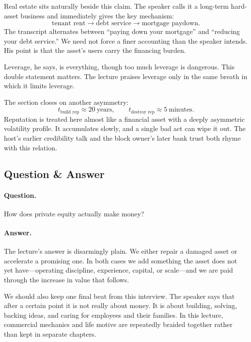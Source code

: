 Real estate sits naturally beside this claim. The speaker calls it a long-term hard-asset business and immediately gives the key mechanism:
\begin{equation}
\text{tenant rent}
\to
\text{debt service}
\to
\text{mortgage paydown}.
\end{equation}
The transcript alternates between ``paying down your mortgage'' and ``reducing your debt service.'' We need not force a finer accounting than the speaker intends. His point is that the asset's users carry the financing burden.

Leverage, he says, is everything, though too much leverage is dangerous. This double statement matters. The lecture praises leverage only in the same breath in which it limits leverage.

The section closes on another asymmetry:
\begin{equation}
t_{\text{build rep}} \approx 20\ \text{years},
\qquad
t_{\text{destroy rep}} \approx 5\ \text{minutes}.
\end{equation}
Reputation is treated here almost like a financial asset with a deeply asymmetric volatility profile. It accumulates slowly, and a single bad act can wipe it out. The host's earlier credibility talk and the block owner's later bank trust both rhyme with this relation.

\subsection{Question \& Answer}

\paragraph{Question.} How does private equity actually make money?

\paragraph{Answer.} The lecture's answer is disarmingly plain. We either repair a damaged asset or accelerate a promising one. In both cases we add something the asset does not yet have---operating discipline, experience, capital, or scale---and we are paid through the increase in value that follows.

We should also keep one final beat from this interview. The speaker says that after a certain point it is not really about money. It is about building, solving, backing ideas, and caring for employees and their families. In this lecture, commercial mechanics and life motive are repeatedly braided together rather than kept in separate chapters.

